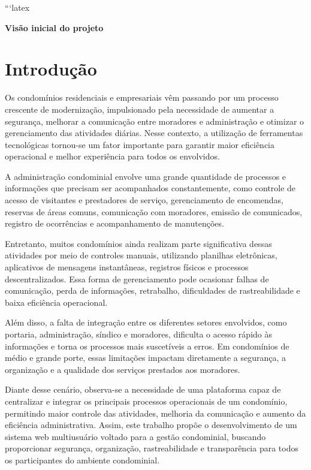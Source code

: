 ```latex
\begin{center}
    \textbf{\Huge{Visão inicial do projeto}}
\end{center}

\section{Introdução}

Os condomínios residenciais e empresariais vêm passando por um processo crescente de modernização, impulsionado pela necessidade de aumentar a segurança, melhorar a comunicação entre moradores e administração e otimizar o gerenciamento das atividades diárias. Nesse contexto, a utilização de ferramentas tecnológicas tornou-se um fator importante para garantir maior eficiência operacional e melhor experiência para todos os envolvidos.

A administração condominial envolve uma grande quantidade de processos e informações que precisam ser acompanhados constantemente, como controle de acesso de visitantes e prestadores de serviço, gerenciamento de encomendas, reservas de áreas comuns, comunicação com moradores, emissão de comunicados, registro de ocorrências e acompanhamento de manutenções.

Entretanto, muitos condomínios ainda realizam parte significativa dessas atividades por meio de controles manuais, utilizando planilhas eletrônicas, aplicativos de mensagens instantâneas, registros físicos e processos descentralizados. Essa forma de gerenciamento pode ocasionar falhas de comunicação, perda de informações, retrabalho, dificuldades de rastreabilidade e baixa eficiência operacional.

Além disso, a falta de integração entre os diferentes setores envolvidos, como portaria, administração, síndico e moradores, dificulta o acesso rápido às informações e torna os processos mais suscetíveis a erros. Em condomínios de médio e grande porte, essas limitações impactam diretamente a segurança, a organização e a qualidade dos serviços prestados aos moradores.

Diante desse cenário, observa-se a necessidade de uma plataforma capaz de centralizar e integrar os principais processos operacionais de um condomínio, permitindo maior controle das atividades, melhoria da comunicação e aumento da eficiência administrativa. Assim, este trabalho propõe o desenvolvimento de um sistema web multiusuário voltado para a gestão condominial, buscando proporcionar segurança, organização, rastreabilidade e transparência para todos os participantes do ambiente condominial.

